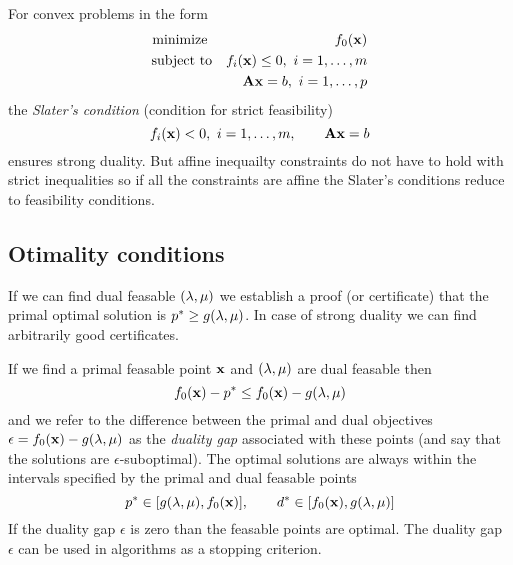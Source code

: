 For convex problems in the form
\begin{eqnarray}\label{eq:ConvexProblem}
  \text{minimize }  & & f_0(\mathbf{x}) \nonumber \\
  \text{subject to} & & f_i(\mathbf{x}) \leq 0, ~ i=1,\ldots,m \\
		    & & \mathbf{Ax} =b, ~ i=1,\ldots,p \nonumber
\end{eqnarray}
the \emph{Slater's condition} (condition for strict feasibility)
\begin{equation}\label{eq:SlatersCond}\index{Slater's condition}
 f_i(\vc{x}) < 0, ~ i=1,\ldots,m, \qquad \vc{Ax} =b
\end{equation}
ensures strong duality.
But affine inequailty constraints do not have to hold with strict inequalities so if all the constraints are affine the Slater's conditions reduce to feasibility conditions.

\subsection{Otimality conditions}\label{sec:OtimalityConditions}
If we can find dual feasable $(\mathbf{\lambda},\mathbf{\mu})$ we establish a proof (or certificate) that the primal optimal solution is $p^* \ge g(\mathbf{\lambda},\mathbf{\mu})$.
In case of strong duality we can find arbitrarily good certificates.

If we find a primal feasable point $\mathbf{x}$ and $(\mathbf{\lambda},\mathbf{\mu})$ are dual feasable then 
\begin{equation}
 f_0(\mathbf{x}) - p^* \leq f_0(\mathbf{x}) - g(\mathbf{\lambda},\mathbf{\mu})
\end{equation}
and we refer to the difference between the primal and dual objectives $\epsilon = f_0(\mathbf{x}) - g(\mathbf{\lambda},\mathbf{\mu})$ as the \emph{duality gap} associated with these points (and say that the solutions are $\epsilon$-suboptimal).
The optimal solutions are always within the intervals specified by the primal and dual feasable points
\begin{equation}
 p^* \in [ g(\mathbf{\lambda},\mathbf{\mu}), f_0(\mathbf{x}) ], \qquad
 d^* \in [ f_0(\mathbf{x}), g(\mathbf{\lambda},\mathbf{\mu}) ] 
\end{equation}
If the duality gap $\epsilon$ is zero than the feasable points are optimal.
The duality gap $\epsilon$ can be used in algorithms as a stopping criterion.



